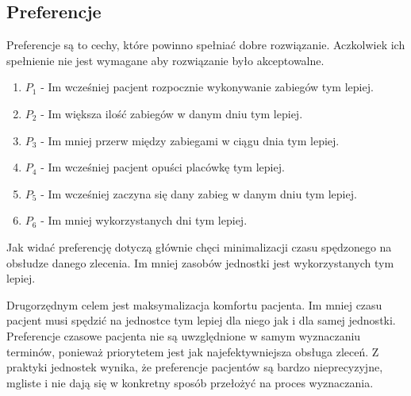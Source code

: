 \subsection{Preferencje}
\label{preferences}
Preferencje są to cechy, które powinno spełniać dobre rozwiązanie.
Aczkolwiek ich spełnienie nie jest wymagane aby rozwiązanie było akceptowalne.
\begin{enumerate}
	\item{$P_1$ - Im wcześniej pacjent rozpocznie wykonywanie zabiegów tym lepiej.}
	\item{$P_2$ - Im większa ilość zabiegów w danym dniu tym lepiej.}
	\item{$P_3$ - Im mniej przerw między zabiegami w ciągu dnia tym lepiej.}
	\item{$P_4$ - Im wcześniej pacjent opuści placówkę tym lepiej. }
	\item{$P_5$ - Im wcześniej zaczyna się dany zabieg w danym dniu tym lepiej.}
	\item{$P_6$ - Im mniej wykorzystanych dni tym lepiej.}
\end{enumerate}

Jak widać preferencję dotyczą głównie chęci minimalizacji czasu spędzonego na
obsłudze danego zlecenia. Im mniej zasobów jednostki jest wykorzystanych tym
lepiej.

Drugorzędnym celem jest maksymalizacja komfortu pacjenta. Im mniej czasu pacjent
musi spędzić na jednostce tym lepiej dla niego jak i dla samej jednostki.
Preferencje czasowe pacjenta nie są uwzględnione w samym wyznaczaniu terminów,
ponieważ priorytetem jest jak najefektywniejsza obsługa zleceń. Z praktyki
jednostek wynika, że preferencje pacjentów są bardzo nieprecyzyjne, mgliste i
nie dają się w konkretny sposób przełożyć na proces wyznaczania.
